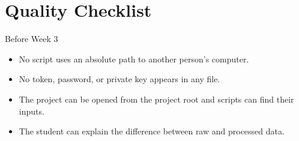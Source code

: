\section{Quality Checklist}
\begin{checklistbox}{Before Week 3}
\begin{itemize}
  \item No script uses an absolute path to another person's computer.
  \item No token, password, or private key appears in any file.
  \item The project can be opened from the project root and scripts can find their inputs.
  \item The student can explain the difference between raw and processed data.
\end{itemize}
\end{checklistbox}
